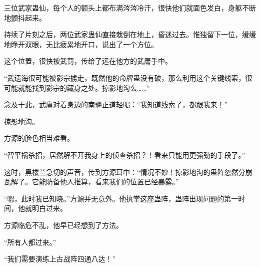 \begin{this_body}
三位武家蛊仙，每个人的额头上都布满涔涔冷汗，很快他们就面色发白，身躯不断地颤抖起来。

持续了片刻之后，两位武家蛊仙直接栽倒在地上，昏迷过去。惟独留下一位，缓缓地睁开双眼，无比疲累地开口，说出了一个方位。

这个位置，很快被武罚，传给了远在他方的武庸手中。

“武遗海很可能被影宗掳走，既然他的命牌蛊没有破，那么利用这个关键线索，很可能就能找到影宗的藏身之处。掠影地沟么……”

念及于此，武庸对着身边的南疆正道轻喝：“我知道线索了，都跟我来！”

掠影地沟。

方源的脸色相当难看。

“智平祸杀招，居然解不开我身上的侦查杀招？！看来只能用更强劲的手段了。”

这时，黑楼兰急切的声音，传到方源耳中：“情况不妙！掠影地沟的蛊阵忽然分崩瓦解了。它能防备他人推算，看来我们的位置已经暴露。”

“嗯，此时我已知晓。”方源并无意外。他执掌这座蛊阵，蛊阵出现问题的第一时间，他就明白过来。

方源临危不乱，他早已经想到了方法。

“所有人都过来。”

“我们需要演练上古战阵四通八达！”

\end{this_body}

